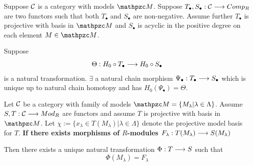 \documentclass[11pt]{book} %
\begin{document}
\begin{theorem}[Conjecture]\label{conj}
Suppose ${\cal C}$ is a category with models $\pzm$. Suppose $T_\bullet, S_\bullet:{\cal C}\longrightarrow Comp_R$ are two functors such that both $T_\bullet$ and $S_\bullet$ are non-negative. Assume further $T_\bullet$ is projective with basis in $\pzm$ and $S_\bullet$ is acyclic in the positive degree on each element $M\in\pzm$.

Suppose 
$$
\Theta: H_0\circ T_\bullet\longrightarrow H_0\circ S_\bullet
$$
 is a natural transformation. $\exists $ a  natural chain morphism $\Psi_\bullet:T_\bullet\longrightarrow S_\bullet$ which is unique up to natural chain homotopy and has $H_0(\Psi_\bullet)=\Theta$.
\end{theorem}
\begin{lemma}\label{conj:lemma1}
Let ${\cal C}$ be a category with family of models $\pzm=\{M_\lambda|\lambda\in \Lambda\}$. Assume $S,T:{\cal C}\longrightarrow Mod_R$ are functors and assume $T$ is projective with basis in $\pzm$. Let
$\chi:=\{x_\lambda\in T(M_\lambda)|\lambda\in \Lambda\}$ denote the projective model basis for $T$. 
\textbf{If there exists morphisms of $R$-modules $F_\lambda: T(M_\lambda)\longrightarrow S(M_\lambda)$} 

Then there exists a unique natural transformation $\Phi:T\longrightarrow S$ such that 
$$
\Phi(M_\lambda)=F_\lambda
$$
\end{lemma}
\end{document}
